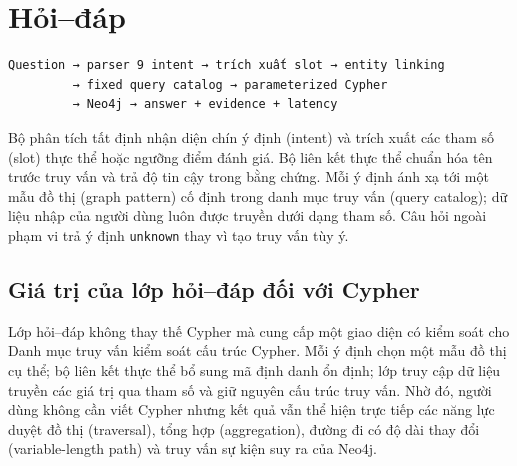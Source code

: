 \section{Hỏi–đáp}

\begin{Verbatim}[fontsize=\scriptsize,frame=single]
Question → parser 9 intent → trích xuất slot → entity linking
         → fixed query catalog → parameterized Cypher
         → Neo4j → answer + evidence + latency
\end{Verbatim}

Bộ phân tích tất định nhận diện chín ý định (intent) và trích xuất các tham số
(slot) thực thể hoặc ngưỡng điểm đánh giá. Bộ liên kết thực thể chuẩn hóa tên
trước truy vấn và trả độ tin cậy trong bằng chứng. Mỗi ý định ánh xạ tới một mẫu
đồ thị (graph pattern) cố định trong danh mục truy vấn (query catalog); dữ liệu
nhập của người dùng luôn được truyền dưới dạng tham số. Câu hỏi ngoài phạm vi trả ý định
\texttt{unknown} thay vì tạo truy vấn tùy ý.

\subsection{Giá trị của lớp hỏi--đáp đối với Cypher}

Lớp hỏi--đáp không thay thế Cypher mà cung cấp một giao diện có kiểm soát cho
Danh mục truy vấn kiểm soát cấu trúc Cypher. Mỗi ý định chọn một mẫu đồ thị cụ
thể; bộ liên kết thực thể bổ sung mã định danh ổn định; lớp truy cập dữ liệu
truyền các giá trị qua tham số và giữ nguyên cấu trúc truy vấn.
Nhờ đó, người dùng không cần viết Cypher nhưng kết quả vẫn thể hiện trực tiếp các
năng lực duyệt đồ thị (traversal), tổng hợp (aggregation), đường đi có độ dài
thay đổi (variable-length path) và truy vấn sự kiện suy ra
của Neo4j.

